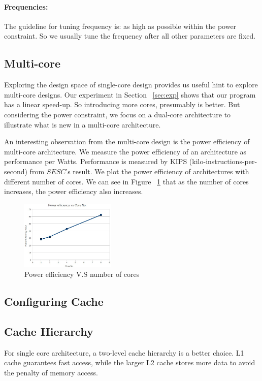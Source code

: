 \documentclass[twocolumn,letterpaper,10pt]{article}
\begin{document}
\paragraph{Frequencies:} The guideline for tuning frequency is: as
high as possible within the power constraint. So we usually tune the
frequency after all other parameters are fixed.


\subsection{Multi-core}
Exploring the design space of single-core design provides us useful
hint to explore multi-core designs. Our experiment in Section ~\ref{sec:exp} shows
that our program has a linear speed-up. So introducing more
cores, presumably is better. But considering the power constraint, we
focus on a dual-core architecture to illustrate what is new in
a multi-core architecture.

An interesting observation from the multi-core design is the power
efficiency of multi-core architecture. We measure the power efficiency of an architecture as performance per
Watts. Performance is measured by KIPS (kilo-instructions-per-second)
from $SESC$'s result. We plot the power efficiency of architectures
with different number of cores. We can see in Figure ~\ref{fig:power} that as the number of cores
increases, the power efficiency also increases.

\begin{figure}[ht!]
\begin{center}
\includegraphics[width=0.4\textwidth]{figures/efficiency.jpg}
\end{center}
\caption{Power efficiency V.S number of cores}
\label{fig:power}
\end{figure}

\subsection{Configuring Cache}

\subsection{Cache Hierarchy}
For single core architecture, a two-level cache hierarchy is a better
choice. L1 cache guarantees fast access, while the larger L2 cache stores
more data to avoid the penalty of memory access.
\end{document}
